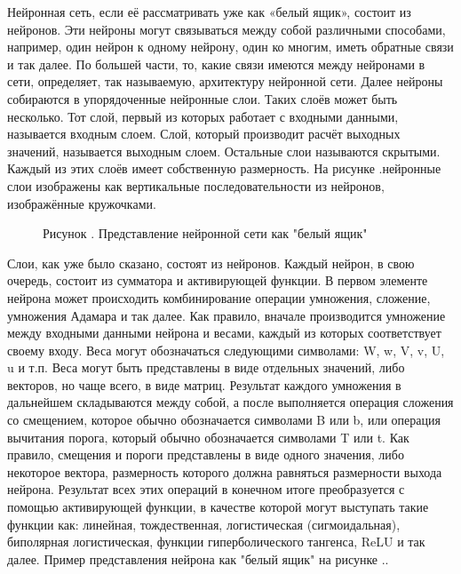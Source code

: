 {	\par \redline Нейронная сеть, если её рассматривать уже как «белый ящик», состоит из нейронов. Эти нейроны могут связываться между собой различными способами, например, один нейрон к одному нейрону, один ко многим, иметь обратные связи и так далее. По большей части, то, какие связи имеются между нейронами в сети, определяет, так называемую, архитектуру нейронной сети. Далее нейроны собираются в упорядоченные нейронные слои. Таких слоёв может быть несколько. Тот слой, первый из которых работает с входными данными, называется входным слоем. Слой, который производит расчёт выходных значений, называется выходным слоем. Остальные слои называются скрытыми. Каждый из этих слоёв имеет собственную размерность. На рисунке \thechaptercntr.\theimagecntr \spc нейронные слои изображены как вертикальные последовательности из нейронов, изображённые кружочками.
	
	\begin{figure}
		\centering
		\def\svgwidth{\textwidth}
		
		\caption*{\gostFont Рисунок \thechaptercntr .\theimagecntr \spc {--} Представление нейронной сети как "белый ящик"}
		\label{fig:NNWhiteBox}
	\end{figure} \addtocounter{imagecntr}{1}
	
	\par \redline Слои, как уже было сказано, состоят из нейронов. Каждый нейрон, в свою очередь, состоит из сумматора и активирующей функции. В первом элементе нейрона может происходить комбинирование операции умножения, сложение, умножения Адамара и так далее. Как правило, вначале производится умножение между входными данными нейрона и весами, каждый из которых соответствует своему входу. Веса могут обозначаться следующими символами: W, w, V, v, U, u и т.п. Веса могут быть представлены в виде отдельных значений, либо векторов, но чаще всего, в виде матриц. Результат каждого умножения в дальнейшем складываются между собой, а после выполняется операция сложения со смещением, которое обычно обозначается символами B или b, или операция вычитания порога, который обычно обозначается символами T или t. Как правило, смещения и пороги представлены в виде одного значения, либо некоторое вектора, размерность которого должна равняться размерности выхода нейрона.  Результат всех этих операций в конечном итоге преобразуется с помощью активирующей функции, в качестве которой могут выступать такие функции как: линейная, тождественная, логистическая (сигмоидальная), биполярная логистическая, функции гиперболического тангенса, ReLU и так далее. Пример представления нейрона как "белый ящик" на рисунке \thechaptercntr .\theimagecntr.  
	
}
